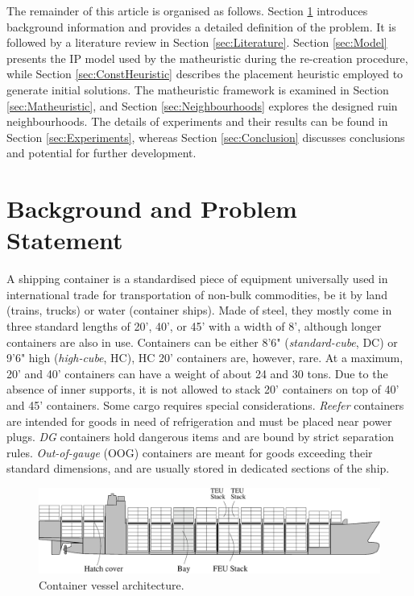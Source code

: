 \documentclass[preprint,11pt,3p]{elsarticle}
\begin{document}
The remainder of this article is organised as follows. Section \ref{sec:Background} introduces background information and provides a detailed definition of the problem. It is followed by a literature review in Section \ref{sec:Literature}. Section \ref{sec:Model} presents the IP model used by the matheuristic during the re-creation procedure, while Section \ref{sec:ConstHeuristic} describes the placement heuristic employed to generate initial solutions. The matheuristic framework is examined in Section \ref{sec:Matheuristic}, and Section \ref{sec:Neighbourhoods} explores the designed ruin neighbourhoods. The details of experiments and their results can be found in Section \ref{sec:Experiments}, whereas Section \ref{sec:Conclusion} discusses conclusions and potential for further development.

\section{Background and Problem Statement}
\label{sec:Background}
A shipping container is a standardised piece of equipment universally used in international trade for transportation of non-bulk commodities, be it by land (trains, trucks) or water (container ships). Made of steel, they mostly come in three standard lengths of 20', 40', or 45' with a width of 8', although longer containers are also in use. Containers can be either 8'6" (\textit{standard-cube}, DC) or 9'6" high (\textit{high-cube}, HC), HC 20' containers are, however, rare. At a maximum, 20' and 40' containers can have a weight of about 24 and 30 tons. Due to the absence of inner supports, it is not allowed to stack 20' containers on top of 40' and 45' containers. Some cargo requires special considerations. \textit{Reefer} containers are intended for goods in need of refrigeration and must be placed near power plugs. \textit{DG} containers hold dangerous items and are bound by strict separation rules. \textit{Out-of-gauge} (OOG) containers are meant for goods exceeding their standard dimensions, and are usually stored in dedicated sections of the ship.

\begin{figure}[ht]
\centering
\includegraphics[width=1.0\linewidth]{Figures/vessel.eps}
\caption{Container vessel architecture.}
\label{fig:vessel}
\end{figure}
\end{document}
